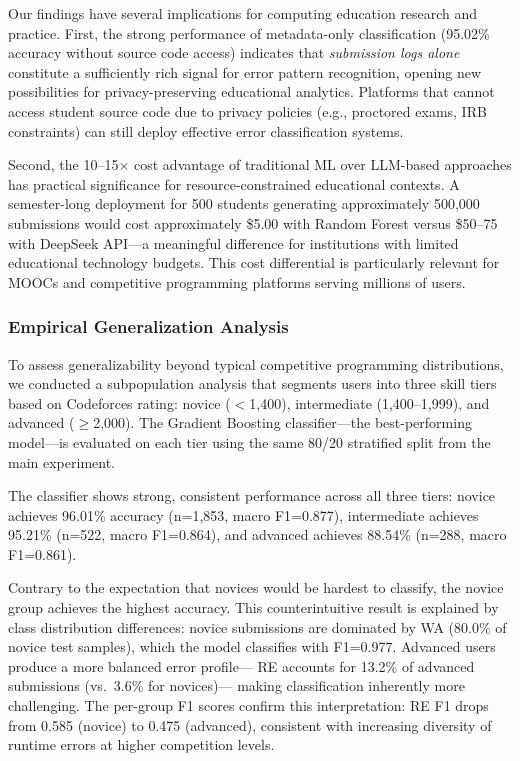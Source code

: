 \documentclass[10pt,a4paper]{article}
\begin{document}
Our findings have several implications for computing education
research and practice. First, the strong performance of metadata-only
classification (95.02\% accuracy without source code access) indicates that
\textit{submission logs alone} constitute a sufficiently rich signal for
error pattern recognition, opening new possibilities for privacy-preserving
educational analytics. Platforms that cannot access student source code
due to privacy policies (e.g., proctored exams, IRB constraints) can
still deploy effective error classification systems.

Second, the 10--15$\times$ cost advantage of traditional ML over LLM-based
approaches has practical significance for resource-constrained educational
contexts. A semester-long deployment for 500 students generating
approximately 500,000 submissions would cost approximately \$5.00 with Random
Forest versus \$50--75 with DeepSeek API---a meaningful difference
for institutions with limited educational technology budgets. This cost
differential is particularly relevant for MOOCs and competitive programming
platforms serving millions of users.

\subsubsection*{Empirical Generalization Analysis}
To assess generalizability beyond typical competitive programming
distributions, we conducted a subpopulation analysis that segments users into
three skill tiers based on Codeforces rating: novice ($<$1,400), intermediate
(1,400--1,999), and advanced ($\geq$2,000). The Gradient Boosting
classifier---the best-performing model---is evaluated on each tier using the
same 80/20 stratified split from the main experiment.

The classifier shows strong, consistent performance across all three tiers:
novice achieves 96.01\% accuracy (n=1,853, macro F1=0.877), intermediate
achieves 95.21\% (n=522, macro F1=0.864), and advanced achieves 88.54\%
(n=288, macro F1=0.861).

Contrary to the expectation that novices would be hardest to classify,
the novice group achieves the highest accuracy. This counterintuitive result
is explained by class distribution differences: novice submissions are
dominated by WA (80.0\% of novice test samples), which the model classifies
with F1=0.977. Advanced users produce a more balanced error profile---
RE accounts for 13.2\% of advanced submissions (vs.\ 3.6\% for novices)---
making classification inherently more challenging. The per-group F1 scores
confirm this interpretation: RE F1 drops from 0.585 (novice) to 0.475
(advanced), consistent with increasing diversity of runtime errors at higher
competition levels.
\end{document}

